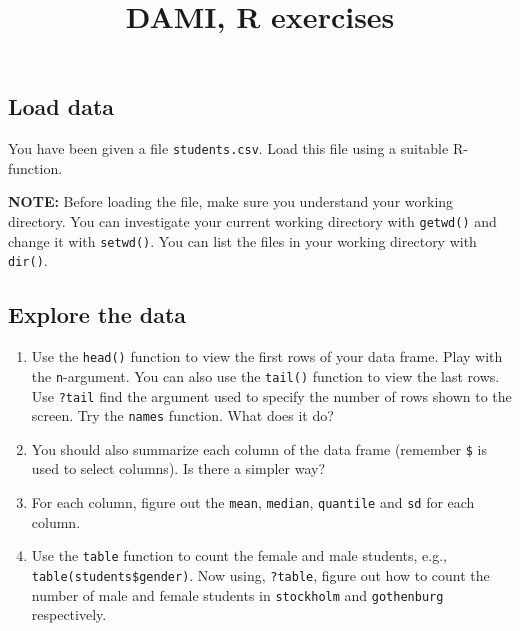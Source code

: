\documentclass[11pt]{article}
\title{DAMI, R exercises}
\begin{document}
\maketitle


\subsection*{Load data}
You have been given a file \texttt{students.csv}. Load this file using
a suitable R-function.

\noindent \textbf{NOTE:} Before loading the file, make sure you
understand your working directory. You can investigate your current
working directory with \texttt{getwd()} and change it with
\texttt{setwd()}. You can list the files in your working directory
with \texttt{dir()}.

\subsection*{Explore the data}
\begin{enumerate}
\item Use the \texttt{head()} function to view the first rows of your
  data frame. Play with the \texttt{n}-argument. You can also use the
  \texttt{tail()} function to view the last rows. Use \texttt{?tail}
  find the argument used to specify the number of rows shown to the
  screen. Try the \texttt{names} function. What does it do?

\item You should also summarize each column of the data frame
  (remember \texttt{\$} is used to select columns). Is there a simpler
  way?

\item For each column, figure out the \texttt{mean}, \texttt{median},
  \texttt{quantile} and \texttt{sd} for each column.

\item Use the \texttt{table} function to count the female and male
  students, e.g., \texttt{table(students\$gender)}. Now using,
  \texttt{?table}, figure out how to count the number of male and
  female students in \texttt{stockholm} and \texttt{gothenburg}
  respectively.
\end{enumerate}
\end{document}
